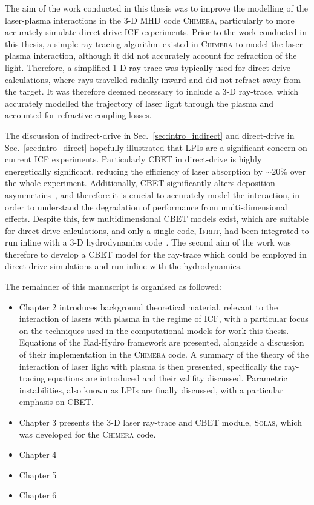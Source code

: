 The aim of the work conducted in this thesis was to improve the modelling of the laser-plasma interactions in the 3-D \ac{MHD} code \textsc{Chimera}, particularly to more accurately simulate direct-drive \ac{ICF} experiments.
Prior to the work conducted in this thesis, a simple ray-tracing algorithm existed in \textsc{Chimera} to model the laser-plasma interaction, although it did not accurately account for refraction of the light.
Therefore, a simplified 1-D ray-trace was typically used for direct-drive calculations, where rays travelled radially inward and did not refract away from the target.
It was therefore deemed necessary to include a 3-D ray-trace, which accurately modelled the trajectory of laser light through the plasma and accounted for refractive coupling losses.

The discussion of indirect-drive in Sec.~\ref{sec:intro_indirect} and direct-drive in Sec.~\ref{sec:intro_direct} hopefully illustrated that \ac{LPIs} are a significant concern on current \ac{ICF} experiments.
Particularly \ac{CBET} in direct-drive is highly energetically significant, reducing the efficiency of laser absorption by $\sim20\%$ over the whole experiment.
Additionally, \ac{CBET} significantly alters deposition asymmetries~\cite{colaitis_inverse_2021}, and therefore it is crucial to accurately model the interaction, in order to understand the degradation of performance from multi-dimensional effects.
Despite this, few multidimensional \ac{CBET} models exist, which are suitable for direct-drive calculations, and only a single code, \textsc{Ifriit}, had been integrated to run inline with a 3-D hydrodynamics code~\cite{colaitis_inverse_2021}.
The second aim of the work was therefore to develop a \ac{CBET} model for the ray-trace which could be employed in direct-drive simulations and run inline with the hydrodynamics.

The remainder of this manuscript is organised as followed:
\begin{itemize}
    \item Chapter 2 introduces background theoretical material, relevant to the interaction of lasers with plasma in the regime of \ac{ICF}, with a particular focus on the techniques used in the computational models for work this thesis.
    Equations of the \ac{Rad-Hydro} framework are presented, alongside a discussion of their implementation in the \textsc{Chimera} code.
    A summary of the theory of the interaction of laser light with plasma is then presented, specifically the ray-tracing equations are introduced and their valifity discussed.
    Parametric instabilities, also known as \ac{LPIs} are finally discussed, with a particular emphasis on \ac{CBET}.
    
    \item Chapter 3 presents the 3-D laser ray-trace and \ac{CBET} module, \textsc{Solas}, which was developed for the \textsc{Chimera} code.
    
    
    \item Chapter 4
    
    \item Chapter 5
    
    \item Chapter 6
    
\end{itemize}

